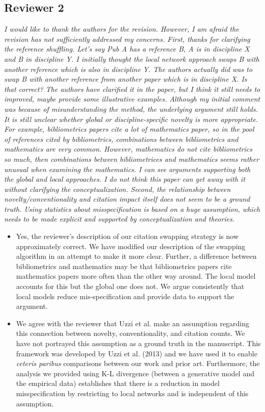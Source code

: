 \documentclass[11pt, oneside]{article}   	%
\begin{document}
\subsection{Reviewer 2}

\emph{I would like to thank the authors for the revision.  However, I am afraid the revision has not sufficiently addressed my concerns. First, thanks for clarifying the reference shuffling.  Let’s say Pub A has a reference B, A is in discipline X and B in discipline Y.  I initially thought the local network approach swaps B with another reference which is also in discipline Y.  The authors actually did was to swap B with another reference from another paper which is in discipline X.  Is that correct?  The authors have clarified it in the paper, but I think it still needs to improved, maybe provide some illustrative examples.  Although my initial comment was because of misunderstanding the method, the underlying argument still holds.  It is still unclear whether global or discipline-specific novelty is more appropriate.  For example, bibliometrics papers cite a lot of mathematics paper, so in the pool of references cited by bibliometrics, combinations between bibliometrics and mathematics are very common. However, mathematics do not cite bibliometrics so much, then combinations between bibliometrices and mathematics seems rather unusual when examining the mathematics. I can see arguments supporting both the global and local approaches. I do not think this paper can get away with it without clarifying the conceptualization. Second, the relationship between novelty/conventionality and citation impact itself does not seem to be a ground truth. Using statistics about misspecification is based on a huge assumption, which needs to be made explicit and supported by conceptualization and theories.}

\begin{itemize}

\item Yes, the reviewer's description of our citation swapping strategy is now approximately correct. We have modified our description of the swapping algorithm in an attempt to make it more clear. Further, a difference between bibliometrics and mathematics may be that bibliometrics papers cite mathematics papers more often than the other way around. The local model accounts for this but the global one does not. We argue consistently that local models reduce mis-specification and provide data to support the argument.
\item We agree with the reviewer that Uzzi et al. make an assumption regarding this connection between novelty, conventionality, and citation counts. We have not portrayed this assumption as a ground truth in the manuscript. This framework was developed by Uzzi et al. (2013) and we have used it to enable \emph{ceteris paribus} comparisons between our work and prior art. Furthermore, the analysis we provided using K-L divergence (between a generative model and the empirical data) establishes that there is a reduction in model misspecification by restricting to local networks and is independent of this assumption.
\end{itemize}
\end{document}

